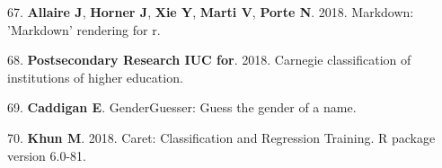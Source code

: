 \documentclass[11pt,]{article}
\begin{document}
\hypertarget{ref-markdown}{}
67. \textbf{Allaire J}, \textbf{Horner J}, \textbf{Xie Y}, \textbf{Marti
V}, \textbf{Porte N}. 2018. Markdown: 'Markdown' rendering for r.

\hypertarget{ref-Carnegie2018}{}
68. \textbf{Postsecondary Research IUC for}. 2018. Carnegie
classification of institutions of higher education.

\hypertarget{ref-caddigan_genderguesser}{}
69. \textbf{Caddigan E}. GenderGuesser: Guess the gender of a name.

\hypertarget{ref-khun_caret_2018}{}
70. \textbf{Khun M}. 2018. Caret: Classification and Regression
Training. R package version 6.0-81.
\end{document}
